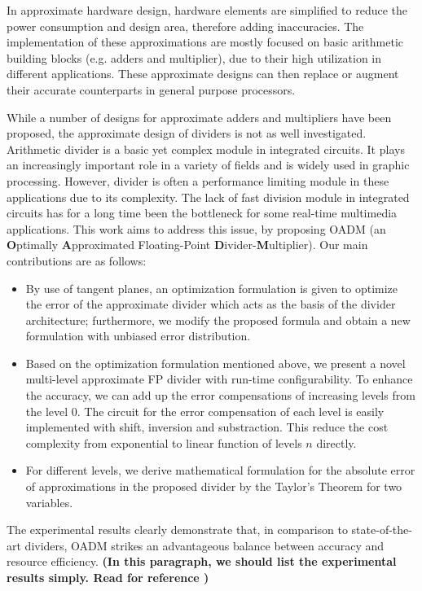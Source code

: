 \documentclass[conference]{IEEEtran}
\begin{document}
In approximate hardware design, hardware elements are simplified to reduce the power consumption and design area, therefore adding inaccuracies. The implementation of these approximations are mostly focused on basic arithmetic building blocks (e.g. adders and multiplier), due to their high utilization in different applications. These
approximate designs can then replace or augment their accurate counterparts in general purpose processors.

While a number of designs for approximate adders and multipliers have been proposed, the approximate design of dividers
is not as well investigated. Arithmetic divider is a basic yet complex module in integrated circuits. It plays an increasingly important role in a
variety of fields and is widely used in graphic processing. However, divider is often a performance limiting module in
these applications due to its complexity. The lack of fast division module in integrated circuits has for a long time been the bottleneck for some real-time multimedia applications. This work aims to address this issue, by proposing OADM (an {\bf O}ptimally {\bf A}pproximated Floating-Point {\bf D}ivider-{\bf M}ultiplier).
Our main contributions are as follows:

\begin{itemize}
\item By use of tangent planes, an optimization formulation is given to optimize the error of the approximate divider which acts as the basis of the divider architecture; furthermore, we modify the proposed formula and obtain a new formulation with unbiased  error distribution.
\item Based on the optimization formulation mentioned above, we present a novel multi-level approximate FP divider with run-time configurability. To enhance the accuracy, we can add up the error compensations of increasing levels from the level 0. The circuit for the error compensation of each level is easily implemented with shift, inversion and substraction. This reduce the cost complexity from exponential to linear function of levels $n$ directly.
\item For different levels, we derive mathematical formulation for the absolute error of approximations in the proposed divider by the Taylor's Theorem for two variables.
\end{itemize}

The experimental results clearly demonstrate that, in comparison to state-of-the-art dividers, OADM strikes an advantageous balance between accuracy and resource efficiency.
{\bf (In this paragraph, we should list the experimental results simply. Read \cite{CWen} for reference )}
\end{document}
